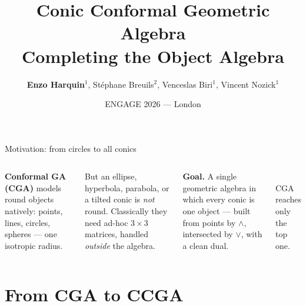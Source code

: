 \documentclass[aspectratio=169, 10pt]{beamer}
\title{Conic Conformal Geometric Algebra\\[2pt]\large Completing the Object Algebra}
\institute[LIGM \& LAMA]{LIGM, Universit\'e Gustave Eiffel \quad LAMA, Universit\'e Savoie Mont-Blanc, CNRS}
\author[Harquin et al.]{\small \textbf{Enzo Harquin}$^1$, St\'ephane Breuils$^2$, Venceslas Biri$^1$, Vincent Nozick$^1$}
\date{\alert{ENGAGE 2026 --- London}}
\newcommand{\wed}{\wedge}
\newcommand{\meet}{\vee}
\begin{document}
\begin{frame}
  \titlepage
\end{frame}

\begin{frame}[t]{Motivation: from circles to all conics}
  \setlength{\columnsep}{20pt}
  \begin{columns}[T]
      \textbf{Conformal GA (CGA)} models \alert{round} objects natively:
      points, lines, \alert{circles}, spheres --- one isotropic radius.

      \vspace{0.5cm}
      But an \alert{ellipse}, \alert{hyperbola}, \alert{parabola}, or a
      \alert{tilted} conic is \emph{not} round. Classically they need ad-hoc
      $3{\times}3$ matrices, handled \emph{outside} the algebra.

      \vspace{0.5cm}
      \textbf{Goal.} A single geometric algebra in which \alert{every conic} is
      one object --- built from points by $\wed$, intersected by $\meet$,
      with a clean dual.

      \centering
      \\[0.2cm]
      {\small CGA reaches only the top one.}
  \end{columns}
\end{frame}

\section{From CGA to CCGA}
\end{document}
